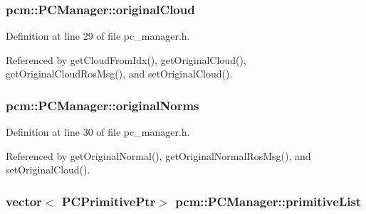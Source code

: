 \hypertarget{classpcm_1_1PCManager_a2f7fc5bdae476711dbd0b79fccca14f3}{
\subsubsection[{original\-Cloud}]{ pcm\-::\-P\-C\-Manager\-::original\-Cloud\hspace{0.3cm}{\ttfamily [private]}}}\label{classpcm_1_1PCManager_a2f7fc5bdae476711dbd0b79fccca14f3}


Definition at line 29 of file pc\-\_\-manager.\-h.



Referenced by get\-Cloud\-From\-Idx(), get\-Original\-Cloud(), get\-Original\-Cloud\-Ros\-Msg(), and set\-Original\-Cloud().

\hypertarget{classpcm_1_1PCManager_a87eb9af97f2704d0bae90e27ef483462}{
\subsubsection[{original\-Norms}]{ pcm\-::\-P\-C\-Manager\-::original\-Norms\hspace{0.3cm}{\ttfamily [private]}}}\label{classpcm_1_1PCManager_a87eb9af97f2704d0bae90e27ef483462}


Definition at line 30 of file pc\-\_\-manager.\-h.



Referenced by get\-Original\-Normal(), get\-Original\-Normal\-Ros\-Msg(), and set\-Original\-Cloud().

\hypertarget{classpcm_1_1PCManager_a0306662716691bbf53aaa55c768d582d}{
\subsubsection[{primitive\-List}]{\setlength{\rightskip}{0pt plus 5cm}vector$<$ {\bf P\-C\-Primitive\-Ptr}$>$ pcm\-::\-P\-C\-Manager\-::primitive\-List\hspace{0.3cm}{\ttfamily [private]}}}\label{classpcm_1_1PCManager_a0306662716691bbf53aaa55c768d582d}


